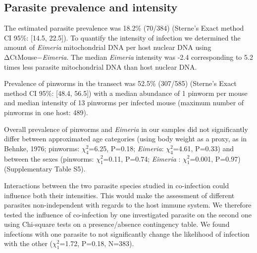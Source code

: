 \subsection{Parasite prevalence and intensity}
The estimated parasite prevalence was 18.2\% (70/384) (Sterne’s Exact method CI 95\%: [14.5, 22.5]). To quantify the intensity of infection we determined the amount of \textit{Eimeria} mitochondrial DNA per host nuclear DNA using ΔCtMouse−\textit{Eimeria}. The median \textit{Eimeria} intensity was -2.4 corresponding to 5.2 times less parasite mitochondrial DNA than host nuclear DNA.
\par Prevalence of pinworms in the transect was 52.5\% (307/585) (Sterne’s Exact method CI 95\%: [48.4, 56.5]) with a median abundance of 1 pinworm per mouse and median intensity of 13 pinworms per infected mouse (maximum number of pinworms in one host: 489). 
\par Overall prevalence of pinworms and \textit{Eimeria} in our samples did not significantly differ between approximated age categories (using body weight as a proxy, as in Behnke, 1976; pinworms: $\chi_{4}^{2}$=6.25, P=0.18; \textit{Eimeria}: $\chi_{4}^{2}$=4.61, P=0.33) and between the sexes (pinworms: $\chi_{1}^{2}$=0.11, P=0.74; \textit{Eimeria} : $\chi_{1}^{2}$=0.001, P=0.97) (Supplementary Table S5).
\par Interactions between the two parasite species studied in co-infection could influence both their intensities. This would make the assessment of different parasites non-independent with regards to the host immune system. We therefore tested the influence of co-infection by one investigated parasite on the second one using Chi-square tests on a presence/absence contingency table. We found infections with one parasite to not significantly change the likelihood of infection with the other ($\chi_{1}^{2}$=1.72, P=0.18, N=383).

